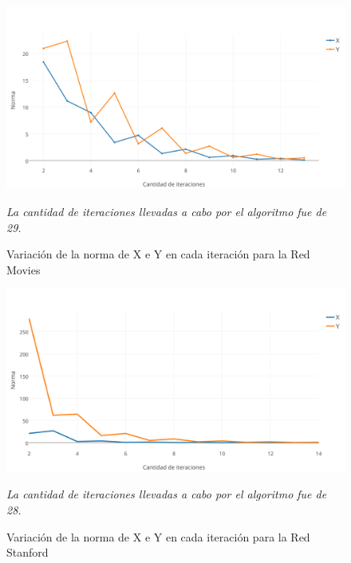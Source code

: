 \documentclass[a4paper]{article}
\begin{document}
\begin{figure}[h!]
  \begin{center}
	\includegraphics[scale=0.50]{imagenes/exp12/moviesHITS.png}
	\caption{Variaci\'on de la norma de X e Y en cada iteraci\'on para la Red Movies}
	\label{nombreparareferenciar}
	\textit{La cantidad de iteraciones llevadas a cabo por el algoritmo fue de 29.}
  \end{center}
\end{figure}
\newpage
\begin{figure}[h!]
  \begin{center}
	\includegraphics[scale=0.50]{imagenes/exp12/stanfordHITS.png}
	\caption{Variaci\'on de la norma de X e Y en cada iteraci\'on para la Red Stanford}
	\label{nombreparareferenciar}
	\textit{La cantidad de iteraciones llevadas a cabo por el algoritmo fue de 28.}
  \end{center}
\end{figure}
\end{document}
